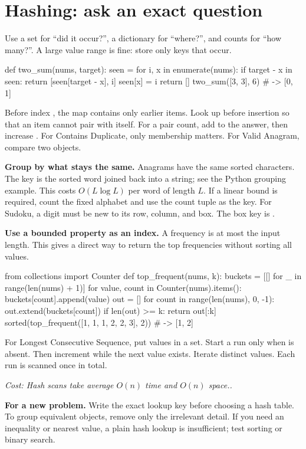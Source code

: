 \documentclass[11pt]{article}
\newcommand{\cd}[1]{{\frenchspacing\texttt{\detokenize{#1}}}}
\newcommand{\transfer}[1]{\par\textbf{For a new problem.} #1\par}
\newcommand{\cost}[1]{\par\textit{Cost: #1.}\par}
\begin{document}
\section{Hashing: ask an exact question}\label{sec:hash}
Use a set for ``did it occur?'', a dictionary for ``where?'', and counts for ``how many?''.
A large value range is fine: store only keys that occur.
\par\noindent\begin{minipage}{\linewidth}
\hypertarget{example-start-13}{}
\begin{pyex}
def two_sum(nums, target):
    seen = {}
    for i, x in enumerate(nums):
        if target - x in seen:
            return [seen[target - x], i]
        seen[x] = i
    return []
two_sum([3, 3], 6)                    # -> [0, 1]
\end{pyex}
\hypertarget{example-end-13}{}
\end{minipage}\par
Before index \cd{i}, the map contains only earlier items. Look up before insertion so that an item cannot pair with itself.
For a pair count, add \cd{count[target - x]} to the answer, then increase \cd{count[x]}.
For Contains Duplicate, only membership matters. For Valid Anagram, compare two \cd{Counter} objects.

\textbf{Group by what stays the same.} Anagrams have the same sorted characters.
The key is the sorted word joined back into a string; see the Python grouping example.
This costs \(O(L\log L)\) per word of length \(L\).
If a linear bound is required, count the fixed alphabet and use the count tuple as the key.
For Sudoku, a digit must be new to its row, column, and box. The box key is \cd{(r // 3, c // 3)}.

\textbf{Use a bounded property as an index.} A frequency is at most the input length.
This gives a direct way to return the top \cd{k} frequencies without sorting all values.
\par\noindent\begin{minipage}{\linewidth}
\hypertarget{example-start-14}{}
\begin{pyex}
from collections import Counter
def top_frequent(nums, k):
    buckets = [[] for _ in range(len(nums) + 1)]
    for value, count in Counter(nums).items():
        buckets[count].append(value)
    out = []
    for count in range(len(nums), 0, -1):
        out.extend(buckets[count])
        if len(out) >= k:
            return out[:k]
sorted(top_frequent([1, 1, 1, 2, 2, 3], 2)) # -> [1, 2]
\end{pyex}
\hypertarget{example-end-14}{}
\end{minipage}\par
For Longest Consecutive Sequence, put values in a set. Start a run only when \cd{x - 1} is absent.
Then increment while the next value exists. Iterate distinct values. Each run is scanned once in total.
\cost{Hash scans take average \(O(n)\) time and \(O(n)\) space.}
\transfer{Write the exact lookup key before choosing a hash table. To group equivalent objects, remove only the irrelevant detail.
If you need an inequality or nearest value, a plain hash lookup is insufficient; test sorting or binary search.}
\end{document}
